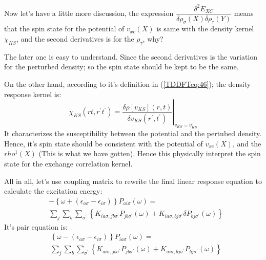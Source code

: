 Now let's have a little more discussion, the expression
$\dfrac{\delta^{2} E_{XC}}
{\delta \rho_{\sigma} (X)\delta \rho_{\tau} (Y)}$ means that the
spin state for the potential of $v_{xc}(X)$ is same with the density
kernel $\chi_{KS}$, and the second derivatives is for the
$\rho_{\tau}$, why?

The later one is easy to understand. Since the second derivatives is
the variation for the perturbed density; so the spin state should be
kept to be the same. 

On the other hand, according to it's definition in
(\ref{TDDFTeq:46}); the density response kernel is:
\begin{equation}
\chi_{KS}(rt,r^{'}t^{'}) =
\left.\frac{\delta\rho[v_{KS}](r,t)}{\delta
v_{KS}(r^{'},t^{'})}\right|_{v_{KS} = v_{KS}^{0}}
\end{equation}
It characterizes the susceptibility between the potential and the
pertubed density. Hence, it's spin state should be consistent with
the potential of $v_{xc}(X)$, and the $rho^{1}(X)$ (This is what we
have gotten). Hence this physically interpret the spin state for the
exchange correlation kernel.

All in all, let's use coupling matrix to rewrite the final linear
response equation to calculate the excitation energy:
\begin{equation}
 \label{TDDFT_ENERGY_EQUATION_eq:12}
\begin{split}
&-\left\lbrace  \omega +
(\epsilon_{a\sigma} -
\epsilon_{i\sigma})\right\rbrace P_{ai\sigma}(\omega) =  \\
&\sum_{j}\sum_{b}\sum_{\sigma^{'}}\left\lbrace K_{ia\sigma,
jb\sigma^{'}}
P_{jb\sigma^{'}}(\omega) + K_{ia\sigma, bj\sigma^{'}}\delta
P_{bj\sigma^{'}}(\omega)\right\rbrace  
\end{split}
\end{equation} 
It's pair equation is:
\begin{equation}
 \label{TDDFT_ENERGY_EQUATION_eq:13}
\begin{split}
&\left\lbrace  \omega -
(\epsilon_{a\sigma} -
\epsilon_{i\sigma})\right\rbrace  P_{ia\sigma} (\omega)  = \\
&\sum_{j}\sum_{b}\sum_{\sigma^{'}}\left\lbrace K_{ai\sigma,
jb\sigma^{'}}
P_{jb\sigma^{'}}
(\omega) + K_{ai\sigma, bj\sigma^{'}}
P_{bj\sigma^{'}}(\omega)\right\rbrace 
\end{split}
\end{equation} 


